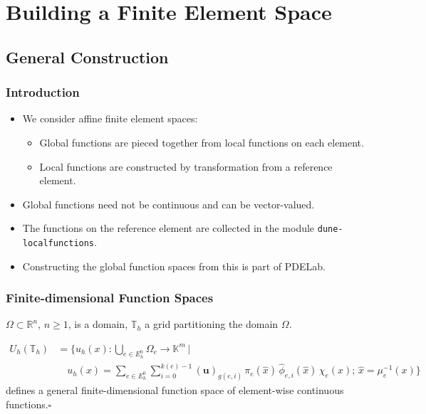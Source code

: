 \section{Building a Finite Element Space}\label{Sec:General}

\subsection{General Construction}

\begin{frame}
\frametitle{Introduction}
\begin{itemize}
\item We consider affine finite element spaces: 
\begin{itemize}
\item Global functions are pieced together from local functions on each element.
\item Local functions are constructed by transformation from a reference element.
\end{itemize}
\item Global functions need not be continuous and can be vector-valued.
\item The functions on the reference element are collected in the module \lstinline{dune-localfunctions}.
\item Constructing the global function spaces from this is part of PDELab.
\end{itemize}
\end{frame}


\begin{frame}
\frametitle{Finite-dimensional Function Spaces}
$\Omega\subset\mathbb{R}^n$, $n\geq 1$, is a domain, 
$\mathbb{T}_h$ a grid partitioning the domain $\Omega$.

\begin{Def}\label{Def:Vh}
\begin{equation*}\label{Eq:GenericFESpace}
\begin{split}
U_h(\mathbb{T}_h) &= \Biggl\{ u_h(x) : \bigcup_{e\in E_h^0}\Omega_e
 \to \mathbb{K}^m\,\Bigg| \\
&\quad u_h(x) = \sum_{e\in E_h^0}\sum_{i=0}^{k(e)-1} (\mathbf{u})_{g(e,i)}
\, \pi_e(\hat{x}) \, \hat\phi_{e,i}(\hat{x}) \, \chi_e(x); \, \hat{x}=\mu_e^{-1}(x) 
 \Biggr\}
\end{split}
\end{equation*}
defines a general finite-dimensional function space of element-wise
continuous functions.\hfill$\square$ 
\end{Def}
\end{frame}

